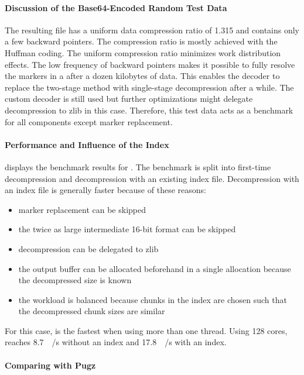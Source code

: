 \paragraph{Discussion of the Base64-Encoded Random Test Data}
The resulting file has a uniform data compression ratio of \num{1.315} and contains only a few backward pointers.
The compression ratio is mostly achieved with the Huffman coding.
The uniform compression ratio minimizes work distribution effects.
The low frequency of backward pointers makes it possible to fully resolve the markers in a \backrefwindow after a dozen kilobytes of data.
This enables the decoder to replace the two-stage method with single-stage decompression after a while.
The custom  decoder is still used but further optimizations might delegate decompression to zlib in this case.
Therefore, this test data acts as a benchmark for all components except marker replacement.

\paragraph{\Pragzip Performance and Influence of the Index}
 displays the benchmark results for \pragzip.
The benchmark is split into first-time decompression and decompression with an existing index file.
Decompression with an index file is generally faster because of these reasons:
\begin{itemize}
    \item marker replacement can be skipped
    \item the twice as large intermediate 16-bit format can be skipped
    \item decompression can be delegated to zlib
    \item the output buffer can be allocated beforehand in a single allocation because the decompressed size is known
    \item the workload is balanced because chunks in the index are chosen such that the decompressed chunk sizes are similar
\end{itemize}
For this case, \pragzip is the fastest when using more than one thread.
Using \num{128} cores, \pragzip reaches \SI{8.7}{\giga\byte/\second} without an index and \SI{17.8}{\giga\byte/\second} with an index.

\paragraph{Comparing \Pragzip with Pugz}

